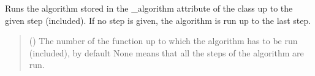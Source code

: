 \documentclass[letterpaper,10pt,english]{sphinxmanual}
\begin{document}
\begin{fulllineitems}
\begin{fulllineitems}
\begin{quote}
\begin{description}
\end{description}\end{quote}

\end{fulllineitems}


\begin{fulllineitems}
\label{\detokenize{source/_autosummary/HDF5_BLS_analyse.Analyse_backend:HDF5_BLS_analyse.Analyse_backend.silent_run_algorithm}}
\pysigstartsignatures
\pysiglinewithargsret
{}
{}
{}
\pysigstopsignatures
\sphinxAtStartPar
Runs the algorithm stored in the \_algorithm attribute of the class up to the given step (included). If no step is given, the algorithm is run up to the last step.
\begin{quote}\begin{description}
\sphinxAtStartPar
{} (\sphinxstyleliteralemphasis{\sphinxupquote{, }}) \textendash{} The number of the function up to which the algorithm has to be run (included), by default None means that all the steps of the algorithm are run.

\end{description}\end{quote}

\end{fulllineitems}



\end{fulllineitems}
\end{document}
